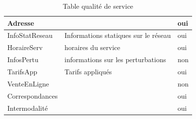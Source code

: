 \documentclass[a4paper]{report}
\begin{document}
\begin{doublespace}
\begin{table}[H]
\begin{center}
\begin{tabularx}{17.5cm}{|p{2.75cm}|X|p{2.5cm}|}
				\hline
				Adresse                                      &                                                     & oui           \\
				\hline
				InfoStatReseau                               & Informations statiques sur le réseau                &
				oui                                                                                                                \\
				\hline
				HoraireServ                                  & horaires du service                                 & oui           \\
				\hline
				InfosPertu                                   & informations sur les perturbations                  & non           \\
				\hline
				TarifsApp                                    & Tarifs appliqués                                    & oui           \\
				\hline
				VenteEnLigne                                 &                                                     & non           \\
				\hline
				Correspondances                              &                                                     & oui           \\
				\hline
				Intermodalité                                &                                                     & oui           \\
				\hline
			\end{tabularx}
			\caption{Table qualité de service}
		\end{center}
	\end{table}


\end{doublespace}
\end{document}
